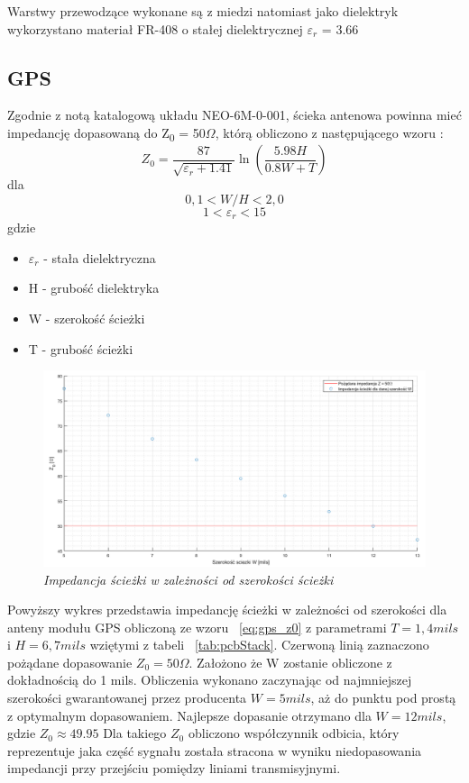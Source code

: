\documentclass[eng,printmode]{mgr}
\begin{document}
Warstwy przewodzące wykonane są z miedzi natomiast jako dielektryk wykorzystano materiał FR-408 o stałej dielektrycznej \textbf{$\varepsilon_r$} = 3.66

\subsection{GPS}
Zgodnie z notą katalogową układu NEO-6M-0-001, ścieka antenowa powinna mieć impedancję dopasowaną do Z\textsubscript{0} = 50\textbf{$\Omega$}, którą obliczono z następującego wzoru :
\begin{equation}
Z_0= \frac{87}{\sqrt{\varepsilon_r + 1.41}}\ln{\left(\frac{5.98H}{0.8W + T}\right)} \label{eq:gps_z0}
\end{equation}
dla 
$$
0,1 < W/H < 2,0
$$
$$
1 < \varepsilon_r < 15
$$
gdzie
\begin{itemize}
  \item \textbf{$\varepsilon_r$} - stała dielektryczna
  \item H - grubość dielektryka
  \item W - szerokość ścieżki
  \item T - grubość ścieżki
\end{itemize}
\newpage
\begin{figure}[!h]
    \centering
    \includegraphics[width=\textwidth]{plots/gpsZ0.png}
    \caption{\textit{\scriptsize Impedancja ścieżki w zależności od szerokości ścieżki}}
\end{figure}

Powyższy wykres przedstawia impedancję ścieżki w zależności od szerokości dla anteny modułu GPS obliczoną ze wzoru ~\ref{eq:gps_z0} z parametrami $T = 1,4 mils$ i $H = 6,7 mils$ wziętymi z tabeli ~\ref{tab:pcbStack}. Czerwoną linią zaznaczono pożądane dopasowanie $Z_0 = 50 \Omega$. Założono że W zostanie obliczone z dokładnością do 1 mils. Obliczenia wykonano zaczynając od najmniejszej szerokości gwarantowanej przez producenta $W = 5 mils$, aż do punktu pod prostą z optymalnym dopasowaniem. Najlepsze dopasanie otrzymano dla $W = 12 mils$, gdzie $Z_0 \approx 49.95$
Dla takiego $Z_0$ obliczono współczynnik odbicia, który reprezentuje jaka część sygnału została stracona w wyniku niedopasowania impedancji przy przejściu pomiędzy liniami transmisyjnymi.
\end{document}
